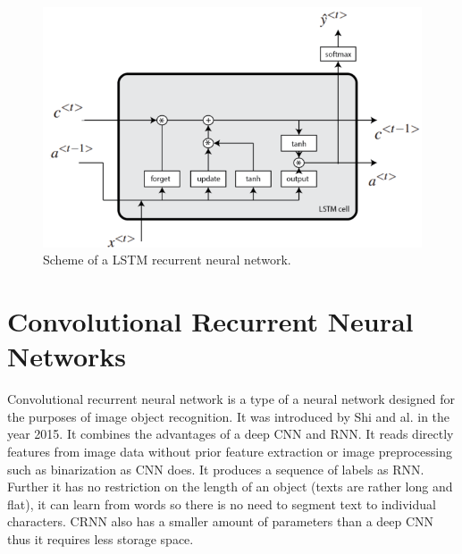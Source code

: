 \begin{figure}[hbtp]
    \centering
    \includegraphics[scale=0.4]{obrazky/lstm.png}

    \caption{Scheme of a LSTM recurrent neural network.\cite{baueldungLSTM}}
    \label{img:LSTM}
\end{figure}


\section{Convolutional Recurrent Neural Networks}
\label{sec:CRNN}

Convolutional recurrent neural network is a type of a neural network designed for the purposes of image object recognition. It was introduced by Shi and al. \cite{crnn} in the year 2015. It combines the advantages of a deep CNN and RNN. It reads directly features from image data without prior feature extraction or image preprocessing such as binarization as CNN does. It produces a sequence of labels as RNN. Further it has no restriction on the length of an object (texts are rather long and flat), it can learn from words so there is no need to segment text to individual characters. CRNN also has a smaller amount of parameters than a deep CNN thus it requires less storage space.\cite{crnn}

